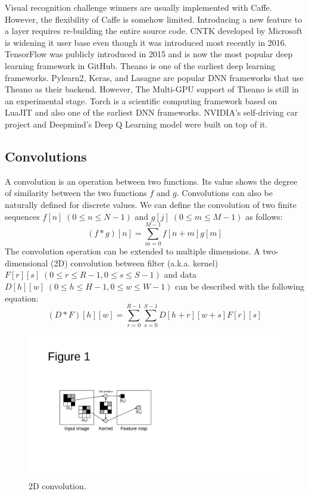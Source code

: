 Visual recognition challenge winners are usually implemented with Caffe\cite{ILSVRC15, RCNN, vgg}. However, the flexibility of Caffe is somehow limited. Introducing a new feature to a layer requires re-building the entire source code. CNTK developed by Microsoft is widening it user base even though it was introduced most recently in 2016. TensorFlow was publicly introduced in 2015 and is now the most popular deep learning framework in GitHub\cite{github}. Theano is one of the earliest deep learning frameworks. Pylearn2\cite{pylearn2}, Keras\cite{keras}, and Lasagne\cite{lasagne} are popular DNN frameworks that use Theano as their backend. However, The Multi-GPU support of Theano is still in an experimental stage. Torch is a scientific computing framework based on LuaJIT\cite{torch} and also one of the earliest DNN frameworks. NVIDIA's self-driving car project\cite{nvdave} and Deepmind's Deep Q Learning model\cite{mnih2015humanlevel} were built on top of it.

\subsection{Convolutions}
A convolution is an operation between two functions. Its value shows the degree of similarity between the two functions $f$ and $g$. Convolutions can also be naturally defined for discrete values. We can define the convolution of two finite sequences $f[n] \; (0 \leq n \leq N-1)$ and $g[j] \; (0 \leq m \leq M-1)$ as follows:
\begin{equation}
\label{def_discrete}
\left ( f * g \right )[n] = \sum_{m=0}^{M-1} f[n + m]g[m]
\end{equation}
The convolution operation can be extended to multiple dimensions. A two-dimensional (2D) convolution between filter (a.k.a. kernel) $F[r][s] \; (0 \leq r \leq R-1, 0 \leq s \leq S-1)$ and data $D[h][w] \; (0 \leq h \leq H-1, 0 \leq w \leq W-1)$ can be described with the following equation:
\begin{equation}
\label{def_2d}
\left ( D * F \right )[h][w] = \sum_{r=0}^{R-1}\sum_{s=0}^{S-1} D[h + r][w + s] F[r][s]
\label{2d-conv}
\end{equation}

\begin{figure}[htbp]
  \centering
  \includegraphics[width=0.6\linewidth]{./figures/feature-map}
  \caption{2D convolution. }
  \label{fig_conv}
\end{figure}

